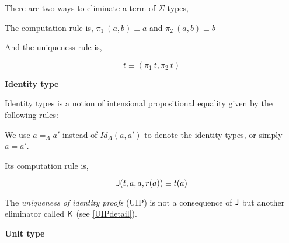 \begin{multicols}{2}
\columnbreak
{}
\end{multicols}

There are two ways to eliminate a term of $\Sigma$-types,

\begin{multicols}{2}
\columnbreak
{}
\end{multicols}

The computation rule is, $\pi_1 ~(a,b) \equiv a$ and $\pi_2 ~(a,b) \equiv b$

And the uniqueness rule is,

$$t \equiv (\pi_1 ~t, \pi_2 ~t)$$

\textbf{Identity type}\label{idtypes} 

Identity types is a notion of intensional propositional equality given by the following rules:

\begin{multicols}{2}
\columnbreak
{}
\end{multicols}

We use  $a =_{A} a'$ instead of $Id_A(a, a')$ to denote the identity types, or simply $a = a'$.


Its computation rule is,

$$\operatorname{\mathsf{J}} (t,a,a,r(a)) \equiv t(a)$$

The \emph{uniqueness of identity proofs} (UIP) is not a consequence of $\operatorname{\mathsf{J}}$ but another eliminator called $\operatorname{\mathsf{K}}$ (see \autoref{UIPdetail}).


\textbf{Unit type}


\begin{multicols}{2}
\columnbreak
{}
\end{multicols}

